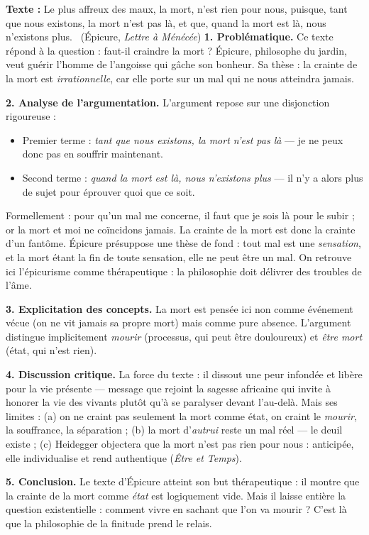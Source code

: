 \documentclass[11pt]{article}
\newcommand{\cle}[1]{{\popxbold\color{popdark}#1}}
\begin{document}
\begin{exoresolu}
\textbf{Texte :} \guillemotleft Le plus affreux des maux, la mort, n'est rien pour nous, puisque, tant que nous existons, la mort n'est pas là, et que, quand la mort est là, nous n'existons plus. \guillemotright\ (Épicure, \emph{Lettre à Ménécée})
\tcblower
\textbf{1. Problématique.} Ce texte répond à la question : faut-il craindre la mort ? Épicure, philosophe du jardin, veut guérir l'homme de l'angoisse qui gâche son bonheur. Sa thèse : la crainte de la mort est \emph{irrationnelle}, car elle porte sur un mal qui ne nous atteindra jamais.

\textbf{2. Analyse de l'argumentation.} L'argument repose sur une disjonction rigoureuse :
\begin{itemize}
\item Premier terme : \emph{tant que nous existons, la mort n'est pas là} — je ne peux donc pas en souffrir maintenant.
\item Second terme : \emph{quand la mort est là, nous n'existons plus} — il n'y a alors plus de sujet pour éprouver quoi que ce soit.
\end{itemize}
Formellement : pour qu'un mal me concerne, il faut que je sois là pour le subir ; or la mort et moi ne coïncidons jamais. La crainte de la mort est donc la crainte d'un fantôme. Épicure présuppose une thèse de fond : tout mal est une \emph{sensation}, et la mort étant la fin de toute sensation, elle ne peut être un mal. On retrouve ici l'épicurisme comme thérapeutique : la philosophie doit délivrer des troubles de l'âme.

\textbf{3. Explicitation des concepts.} La \cle{mort} est pensée ici non comme événement vécue (on ne vit jamais sa propre mort) mais comme pure absence. L'argument distingue implicitement \emph{mourir} (processus, qui peut être douloureux) et \emph{être mort} (état, qui n'est rien).

\textbf{4. Discussion critique.} La force du texte : il dissout une peur infondée et libère pour la vie présente — message que rejoint la sagesse africaine qui invite à honorer la vie des vivants plutôt qu'à se paralyser devant l'au-delà. Mais ses limites : (a) on ne craint pas seulement la mort comme état, on craint le \emph{mourir}, la souffrance, la séparation ; (b) la mort d'\emph{autrui} reste un mal réel — le deuil existe ; (c) Heidegger objectera que la mort n'est pas rien pour nous : anticipée, elle individualise et rend authentique (\emph{Être et Temps}).

\textbf{5. Conclusion.} Le texte d'Épicure atteint son but thérapeutique : il montre que la crainte de la mort comme \emph{état} est logiquement vide. Mais il laisse entière la question existentielle : comment vivre en sachant que l'on va mourir ? C'est là que la philosophie de la finitude prend le relais.
\end{exoresolu}
\end{document}
